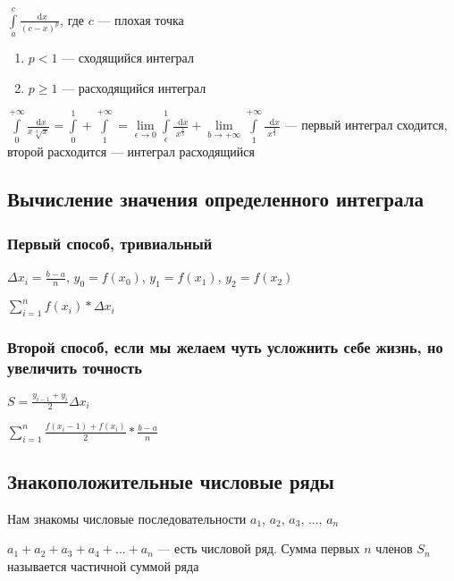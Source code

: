 \documentclass{article}
\newcommand*\diff{\mathop{}\!\mathrm{d}}
\begin{document}
$\int\limits_{a}^{c} \frac{\diff x}{(c - x)^{p}}$, где $c$ — плохая точка

\begin{enumerate}
    \item $p < 1$ — сходящийся интеграл
    \item $p \ge 1$ — расходящийся интеграл
\end{enumerate}

\hfill

$\int\limits_{0}^{+\infty} \frac{\diff x}{x \sqrt[3]{x}} = \int\limits_{0}^{1} + \int\limits_{1}^{+\infty} = \lim\limits_{\epsilon \to 0} \int\limits_{\epsilon}^{1} \frac{\diff x}{x^{\frac{4}{3}}} + \lim\limits_{b \to +\infty} \int\limits_{1}^{+\infty} \frac{\diff x}{x^{\frac{4}{3}}}$ — первый интеграл сходится, второй расходится — интеграл расходящийся

\subsection{Вычисление значения определенного интеграла}

\subsubsection{Первый способ, тривиальный}

$\Delta x_i = \frac{b - a}{n}$, $y_0 = f(x_0)$, $y_1 = f(x_1)$, $y_2 = f(x_2)$

$\sum\limits_{i = 1}^{n} f(x_i) * \Delta x_i$

\subsubsection{Второй способ, если мы желаем чуть усложнить себе жизнь, но увеличить точность}

$S = \frac{y_{i - 1} + y_{i}}{2} \Delta x_i$

$\sum\limits_{i = 1}^{n} \frac{f(x_i - 1) + f(x_i)}{2} * \frac{b - a}{n}$

\subsection{Знакоположительные числовые ряды}

Нам знакомы числовые последовательности $a_1$, $a_2$, $a_3$, ..., $a_n$

$a_1 + a_2 + a_3 + a_4 + \dots + a_n$ — есть числовой ряд. Сумма первых $n$ членов $S_{n}$ называется частичной суммой ряда
\end{document}
